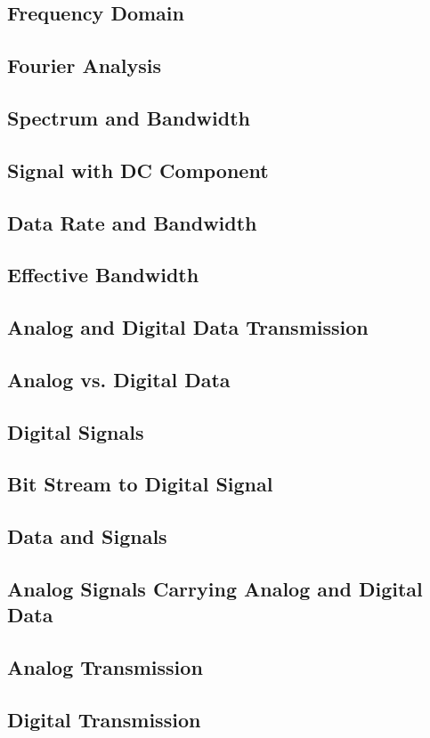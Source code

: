 \documentclass[11pt]{article}
\begin{document}
\subsection{Frequency Domain}
\subsection{Fourier Analysis}
\subsection{Spectrum and Bandwidth}
\subsection{Signal with DC Component}
\subsection{Data Rate and Bandwidth}
\subsection{Effective Bandwidth}
\subsection{Analog and Digital Data Transmission}
\subsection{Analog vs. Digital Data}
\subsection{Digital Signals}
\subsection{Bit Stream to Digital Signal}
\subsection{Data and Signals}
\subsection{Analog Signals Carrying Analog and Digital Data}
\subsection{Analog Transmission}
\subsection{Digital Transmission}
\end{document}

